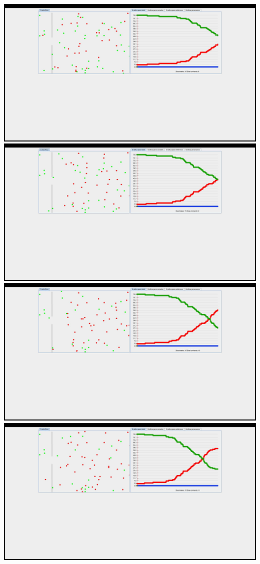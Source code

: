 \documentclass{report}
\begin{document}
\includegraphics[scale=0.20]{8}
\includegraphics[scale=0.20]{9}
\includegraphics[scale=0.20]{10}
\includegraphics[scale=0.20]{11}
\end{document}
